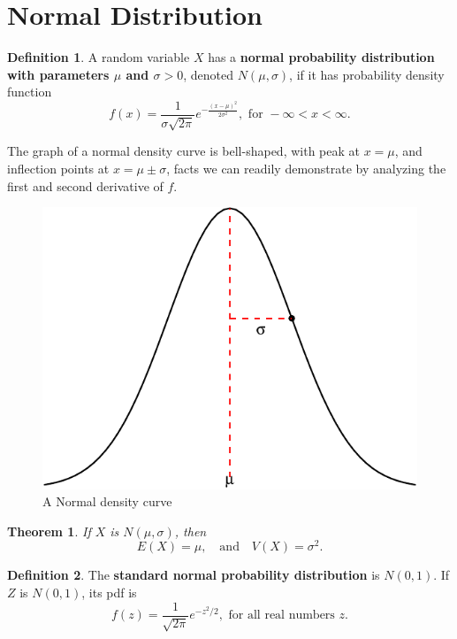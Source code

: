 \documentclass[
]{book}
\newtheorem{theorem}{Theorem}[chapter]
\theoremstyle{definition}
\newtheorem{definition}{Definition}[chapter]
\theoremstyle{definition}
\theoremstyle{definition}
\theoremstyle{definition}
\theoremstyle{remark}
\begin{document}
\section{Normal Distribution}\label{normal}

\begin{definition}
\protect\hypertarget{def:normal-distribution}{}\label{def:normal-distribution}A random variable \(X\) has a \textbf{normal probability distribution with parameters \(\mu\) and \(\sigma > 0\)}, denoted \(N(\mu,\sigma)\), if it has probability density function
\[
f(x)=\frac{1}{\sigma\sqrt{2\pi}}e^{-\frac{(x-\mu)^2}{2\sigma^2}}, \text{ for } -\infty < x < \infty.
\]
\end{definition}

The graph of a normal density curve is bell-shaped, with peak at \(x = \mu\), and inflection points at \(x = \mu \pm \sigma\), facts we can readily demonstrate by analyzing the first and second derivative of \(f\).

\begin{figure}
\centering
\includegraphics{math340-notes_files/figure-latex/bell-curve-1.pdf}
\caption{\label{fig:bell-curve}A Normal density curve}
\end{figure}

\begin{theorem}
\protect\hypertarget{thm:normal-EandV}{}\label{thm:normal-EandV}If \(X\) is \(N(\mu,\sigma)\), then \[E(X) = \mu, ~~~ \text{ and } ~~~ V(X) = \sigma^2.\]
\end{theorem}

\begin{definition}
\protect\hypertarget{def:standard-normal}{}\label{def:standard-normal}The \textbf{standard normal probability distribution} is \(N(0,1)\). If \(Z\) is \(N(0,1)\), its pdf is \[f(z) = \frac{1}{\sqrt{2\pi}}e^{-z^2/2}, \text{ for all real numbers } z.\]
\end{definition}
\end{document}
